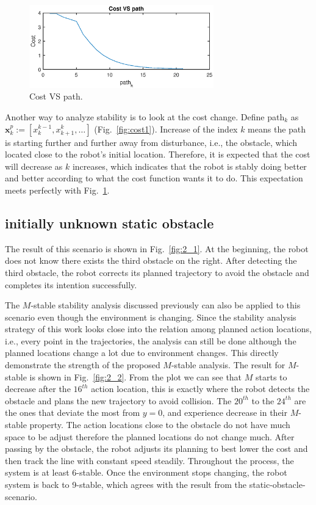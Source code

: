 \documentclass{ifacconf}
\begin{document}
\begin{figure}[htbp]
\begin{center}
\includegraphics[width=8cm]{plot/1_3.eps}
\caption{Cost VS path.}
\label{fig:costplot}
\end{center}
\end{figure}

Another way to analyze stability is to look at the cost change. Define path$_k$ as $\mathbf{x}_{k}^{p} := [x_{k}^{k-1},x_{k+1}^{k},\ldots]$ (Fig.~\ref{fig:cost1}). Increase of the index $k$ means the path is starting further and further away from disturbance, i.e., the obstacle, which located close to the robot's initial location. Therefore, it is expected that the cost will decrease as $k$ increases, which indicates that the robot is stably doing better and better according to what the cost function wants it to do. This expectation meets perfectly with Fig.~\ref{fig:costplot}. 

\subsection{initially unknown static obstacle}

The result of this scenario is shown in Fig.~\ref{fig:2_1}. At the beginning, the robot does not know there exists the third obstacle on the right. After detecting the third obstacle, the robot corrects its planned trajectory to avoid the obstacle and completes its intention successfully.

The $M$-stable stability analysis discussed previously can also be applied to this scenario even though the environment is changing. Since the stability analysis strategy of this work looks close into the relation among planned action locations, i.e., every point in the trajectories, the analysis can still be done although the planned locations change a lot due to environment changes. This directly demonstrate the strength of the proposed $M$-stable analysis. The result for $M$-stable is shown in Fig.~\ref{fig:2_2}. From the plot we can see that $M$ starts to decrease after the $16^{th}$ action location, this is exactly where the robot detects the obstacle and plans the new trajectory to avoid collision. The $20^{th}$ to the $24^{th}$ are the ones that deviate the most from $y=0$, and experience decrease in their $M$-stable property. The action locations close to the obstacle do not have much space to be adjust therefore the planned locations do not change much. After passing by the obstacle, the robot adjusts its planning to best lower the cost and then track the line with constant speed steadily. Throughout the process, the system is at least 6-stable. Once the environment stops changing, the robot system is back to 9-stable, which agrees with the result from the static-obstacle-scenario.     
\end{document}

